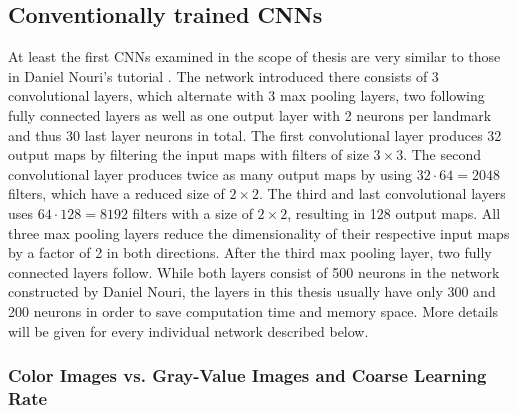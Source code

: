 \documentclass[11pt, a4paper]{article}
\begin{document}
\subsection{Conventionally trained CNNs}

At least the first \acp{CNN} examined in the scope of thesis are very similar to those in Daniel Nouri's tutorial \cite{nouri-tutorial}. The network introduced there consists of 3 convolutional layers, which alternate with 3 max pooling layers, two following fully connected layers as well as one output layer with 2 neurons per landmark and thus 30 last layer neurons in total. The first convolutional layer produces 32 output maps by filtering the input maps with filters of size $3\times 3$. The second convolutional layer produces twice as many output maps by using $32 \cdot 64 = 2048$ filters, which have a reduced size of $2\times 2$. The third and last convolutional layers uses $64 \cdot 128 = 8192$ filters with a size of $2\times2$, resulting in 128 output maps. All three max pooling layers reduce the dimensionality of their respective input maps by a factor of 2 in both directions. After the third max pooling layer, two fully connected layers follow. While both layers consist of 500 neurons in the network constructed by Daniel Nouri, the layers in this thesis usually have only 300 and 200 neurons in order to save computation time and memory space. More details will be given for every individual network described below.

\subsubsection{Color Images vs. Gray-Value Images and Coarse Learning Rate}
\label{subsubsec:color_gray_learningrate}
\end{document}
